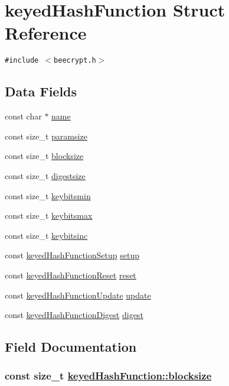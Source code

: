 \hypertarget{structkeyedHashFunction}{
\section{keyed\-Hash\-Function Struct Reference}
\label{structkeyedHashFunction}
}
{\tt \#include $<$beecrypt.h$>$}

\subsection*{Data Fields}
\begin{CompactItemize}
\item 
const char $\ast$ \hyperlink{structkeyedHashFunction_o0}{name}
\item 
const size\_\-t \hyperlink{structkeyedHashFunction_o1}{paramsize}
\item 
const size\_\-t \hyperlink{structkeyedHashFunction_o2}{blocksize}
\item 
const size\_\-t \hyperlink{structkeyedHashFunction_o3}{digestsize}
\item 
const size\_\-t \hyperlink{structkeyedHashFunction_o4}{keybitsmin}
\item 
const size\_\-t \hyperlink{structkeyedHashFunction_o5}{keybitsmax}
\item 
const size\_\-t \hyperlink{structkeyedHashFunction_o6}{keybitsinc}
\item 
const \hyperlink{beecrypt_8h_a11}{keyed\-Hash\-Function\-Setup} \hyperlink{structkeyedHashFunction_o7}{setup}
\item 
const \hyperlink{beecrypt_8h_a12}{keyed\-Hash\-Function\-Reset} \hyperlink{structkeyedHashFunction_o8}{reset}
\item 
const \hyperlink{beecrypt_8h_a13}{keyed\-Hash\-Function\-Update} \hyperlink{structkeyedHashFunction_o9}{update}
\item 
const \hyperlink{beecrypt_8h_a14}{keyed\-Hash\-Function\-Digest} \hyperlink{structkeyedHashFunction_o10}{digest}
\end{CompactItemize}


\subsection{Field Documentation}
\hypertarget{structkeyedHashFunction_o2}{
\subsubsection[blocksize]{\setlength{\rightskip}{0pt plus 5cm}const size\_\-t \hyperlink{structkeyedHashFunction_o2}{keyed\-Hash\-Function::blocksize}}}
\label{structkeyedHashFunction_o2}


